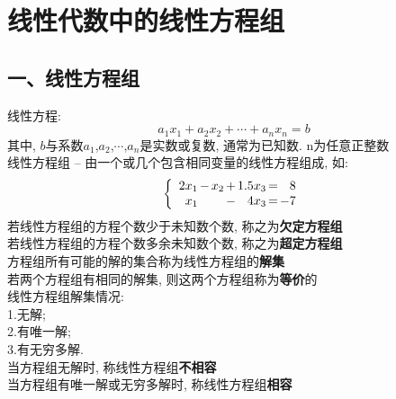 \chapter{线性代数中的线性方程组}
\section{一、线性方程组}
线性方程:
	\[ a_{1}x_{1}+a_{2}x_{2}+\cdots +a_{n}x_{n}=b \]
其中, $b$与系数$a_{1}$,$a_{2}$,$\cdots$,$a_{n}$是实数或复数, 通常为已知数. n为任意正整数\\[2ex]

线性方程组 -- 由一个或几个包含相同变量的线性方程组成, 如:
\[\left\{\begin{array}{r@{\hspace{1.5pt}}l@{\hspace{1.5pt}}r@{\hspace{1.5pt}}l@{\hspace{1.5pt}}r@{\hspace{1.5pt}}l@{\hspace{1.5pt}}r}
	2x_1 & - & x_2 & + & 1.5x_3 & = & 8\\
	x_1  &   &     & - & 4x_3   & = & -7		
\end{array}\right.\]
若线性方程组的方程个数少于未知数个数, 称之为\textbf{欠定方程组}\\
若线性方程组的方程个数多余未知数个数, 称之为\textbf{超定方程组}\\
方程组所有可能的解的集合称为线性方程组的\textbf{解集}\\
若两个方程组有相同的解集, 则这两个方程组称为\textbf{等价}的\\[2ex]

线性方程组解集情况:\\
1.无解;\\
2.有唯一解;\\
3.有无穷多解.\\[1ex]
当方程组无解时, 称线性方程组\textbf{不相容}\\
当方程组有唯一解或无穷多解时, 称线性方程组\textbf{相容}\\[2ex]

